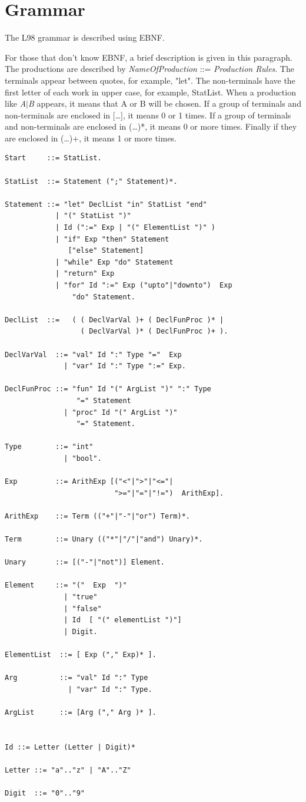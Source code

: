 \documentclass[a4paper, 11pt]{report}
\begin{document}
\section{Grammar}
The L98 grammar is described using EBNF.

For those that don't know EBNF, a brief description is given in this
paragraph. The productions are described by \emph{NameOfProduction} ::=
\emph{Production Rules}. The terminals appear between quotes, for
example, "let". The non-terminals have the first letter of each
work in upper case, for example, StatList. When a production like
\emph{A$|$B} appears, it means that A or B will be chosen. If a group
of terminals and non-terminals are enclosed in [\dots], it means 0
or 1 times. If a group of terminals and non-terminals are enclosed
in (\dots)*, it means 0 or more times. Finally if they are enclosed
in (\dots)+, it means 1 or more times. 

\begin{verbatim}
Start     ::= StatList.

StatList  ::= Statement (";" Statement)*.

Statement ::= "let" DeclList "in" StatList "end"
            | "(" StatList ")"
            | Id (":=" Exp | "(" ElementList ")" )
            | "if" Exp "then" Statement
               ["else" Statement]
            | "while" Exp "do" Statement
            | "return" Exp
            | "for" Id ":=" Exp ("upto"|"downto")  Exp
                "do" Statement.

DeclList  ::=   ( ( DeclVarVal )+ ( DeclFunProc )* | 
                  ( DeclVarVal )* ( DeclFunProc )+ ).
  
DeclVarVal  ::= "val" Id ":" Type "="  Exp
              | "var" Id ":" Type ":=" Exp.

DeclFunProc ::= "fun" Id "(" ArgList ")" ":" Type
                 "=" Statement
              | "proc" Id "(" ArgList ")"
                 "=" Statement.

Type        ::= "int"
              | "bool".

Exp         ::= ArithExp [("<"|">"|"<="|
                          ">="|"="|"!=")  ArithExp].
    
ArithExp    ::= Term (("+"|"-"|"or") Term)*.

Term        ::= Unary (("*"|"/"|"and") Unary)*.

Unary       ::= [("-"|"not")] Element.

Element     ::= "("  Exp  ")"
              | "true"
              | "false"
              | Id  [ "(" elementList ")"]
              | Digit.

ElementList  ::= [ Exp ("," Exp)* ].

Arg          ::= "val" Id ":" Type
               | "var" Id ":" Type.

ArgList      ::= [Arg ("," Arg )* ].


Id ::= Letter (Letter | Digit)*

Letter ::= "a".."z" | "A".."Z"

Digit  ::= "0".."9"

\end{verbatim}
\end{document}
